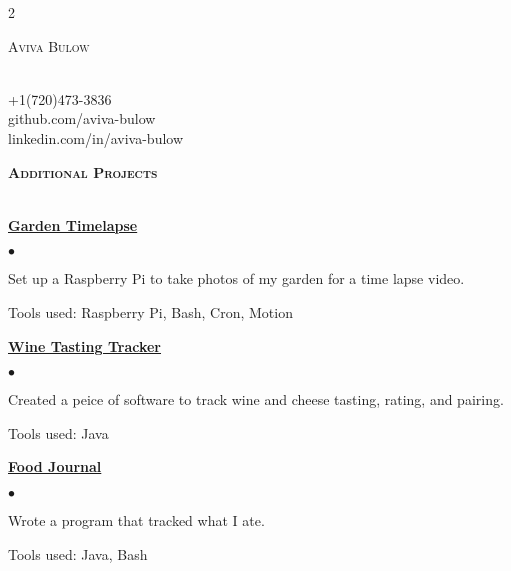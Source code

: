 \documentclass{article}
\newcommand{\lineunder}{\vspace*{-8pt} \\ \hspace*{-18pt} \hrulefill \\}
\newcommand{\header}[1]{{\vspace*{8pt}\hspace*{-16pt} \textsc{\textbf{\large{#1}}}} \vspace*{4pt} \lineunder \vspace*{4pt}}
\newcommand{\project}[1]{\vspace{-2pt}\underline{\bf{#1}}\vspace{5pt}}
\newcommand{\contact}[5]{
\begin{multicols}{2}
    \raggedcolumns
    \begin{flushleft}
    { \Huge \scshape {#1}}\\
    \end{flushleft}
    
\columnbreak

    \begin{flushright}
    #2 \\ #3 \\
    #4 \\ #5 \\
    \end{flushright}

\end{multicols}

}
\newenvironment{achievements}{\begin{list}{$\bullet$}{\topsep 0pt \itemsep -2pt}}{\vspace*{4pt}\end{list}}
\begin{document}
\newpage

\contact{\huge{Aviva Bulow}}{}{+1(720)473-3836}{github.com/aviva-bulow}{linkedin.com/in/aviva-bulow}

\vspace{-10pt}
\vspace{-10pt}


\header{Additional Projects}

\project{Garden Timelapse}
    \begin{achievements}
        \item Set up a Raspberry Pi to take photos of my garden for a time lapse video.
        \item Tools used: Raspberry Pi, Bash, Cron, Motion
    \end{achievements}
    
\project{Wine Tasting Tracker}
    \begin{achievements}
        \item Created a peice of software to track wine and cheese tasting, rating, and pairing.
        \item Tools used: Java
    \end{achievements}
    
\project{Food Journal}
    \begin{achievements}
        \item Wrote a program that tracked what I ate. 
        \item Tools used: Java, Bash
    \end{achievements}
        

\end{document}
